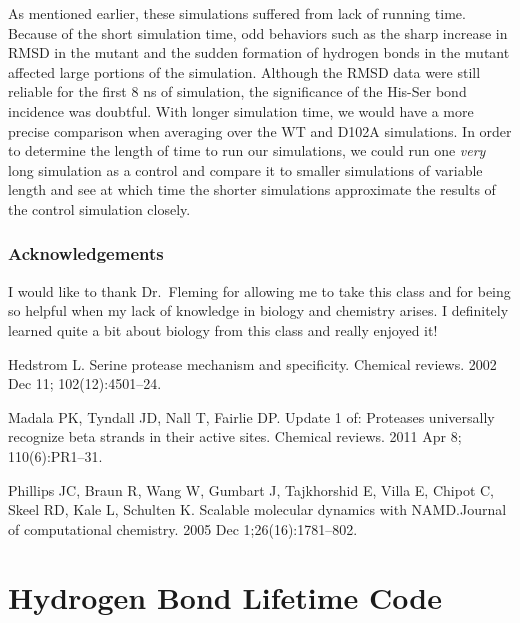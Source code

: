 \documentclass[11pt, twocolumn]{article}
\begin{document}
As mentioned earlier, these simulations suffered from lack of running time.
Because of the short simulation time, odd behaviors such as the sharp increase
in RMSD in the mutant and the sudden formation of hydrogen bonds in the mutant
affected large portions of the simulation. Although the RMSD data were still
reliable for the first 8 ns of simulation, the significance of the His-Ser bond
incidence was doubtful. With longer
simulation time, we would have a more precise comparison when averaging over
the WT and D102A simulations. In order to determine the length of time to run
our simulations, we could run one \textit{very} long simulation as a
control and compare it to smaller simulations of variable length and see
at which time the shorter simulations approximate the results of the control
simulation closely.

\subsubsection*{Acknowledgements}

I would like to thank Dr.\ Fleming for allowing me to take this class
and for being so helpful when my lack of knowledge in biology and chemistry
arises. I definitely learned quite a bit about biology from this class and
really enjoyed it!

\begin{thebibliography}{9}
Hedstrom L. Serine protease mechanism and specificity.
Chemical reviews. 2002 Dec 11; 102(12):4501--24.

Madala PK, Tyndall JD, Nall T, Fairlie DP.\@
Update 1 of: Proteases universally recognize beta strands in their
active sites. Chemical reviews. 2011 Apr 8; 110(6):PR1--31.

Phillips JC, Braun R, Wang W, Gumbart J, Tajkhorshid E, Villa E,
Chipot C, Skeel RD, Kale L, Schulten K. Scalable molecular dynamics
with NAMD.\@ Journal of computational chemistry. 2005 Dec 1;26(16):1781--802.

\end{thebibliography}

\appendix

\onecolumn
\section{Hydrogen Bond Lifetime Code}\label{code}
\end{document}
